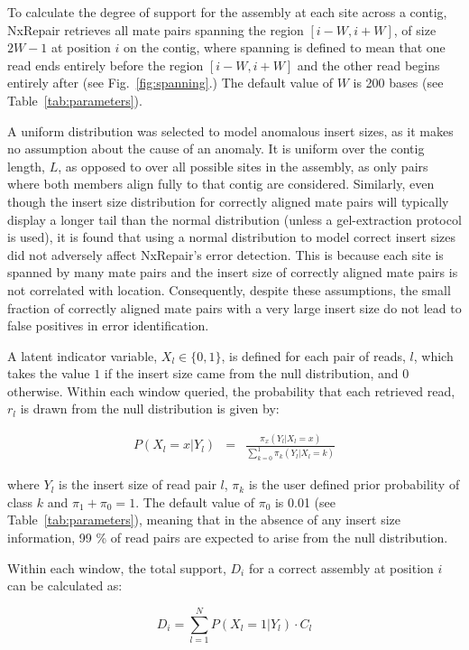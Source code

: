 To calculate the degree of support for the assembly at each site across a contig, NxRepair retrieves all mate pairs spanning the region $[i-W, i+W]$, of size $2W-1$ at position $i$ on the contig, where spanning is defined to mean that one read ends entirely before the region $[i-W, i+W]$ and the other read begins entirely after (see Fig.~\ref{fig:spanning}.) The default value of $W$ is 200 bases (see Table~\ref{tab:parameters}). 

A uniform distribution was selected to model anomalous insert sizes, as it makes no assumption about the cause of an anomaly. It is uniform over the contig length, $L$, as opposed to over all possible sites in the assembly, as only pairs where both members align fully to that contig are considered. Similarly, even though the insert size distribution for correctly aligned mate pairs will typically display a longer tail than the normal distribution (unless a gel-extraction protocol is used), it is found that using a normal distribution to model correct insert sizes did not adversely affect NxRepair's error detection. This is because each site is spanned by many mate pairs and the insert size of correctly aligned mate pairs is not correlated with location. Consequently, despite these assumptions, the small fraction of correctly aligned mate pairs with a very large insert size do not lead to false positives in error identification. 

A latent indicator variable, $X_l\in\{0,1\}$, is defined for each pair of reads, $l$, which takes the value $1$ if the insert size came from the null distribution, and $0$ otherwise. Within each window queried, the probability that each retrieved read, $r_l$ is drawn from the null distribution is given by:

\begin{eqnarray} P(X_l=x|Y_l)& =& \frac{\pi_x(Y_l|X_l=x)}{\sum_{k=0}^1 \pi_k(Y_l|X_l=k)}
\label{eq:posterior}  
\end{eqnarray}

where $Y_l$ is the insert size of read pair $l$, $\pi_k$ is the user defined prior probability of class $k$ and $\pi_1 + \pi_0 = 1$. The default value of $\pi_0$ is 0.01 (see Table~\ref{tab:parameters}), meaning that in the absence of any insert size information, 99 \% of read pairs are expected to arise from the null distribution.  

Within each window, the total support, $D_i$ for a correct assembly at position $i$ can be calculated as:

\begin{equation}
D_i = \sum_{l=1}^N P(X_l=1|Y_l)\cdot C_l
\end{equation}

